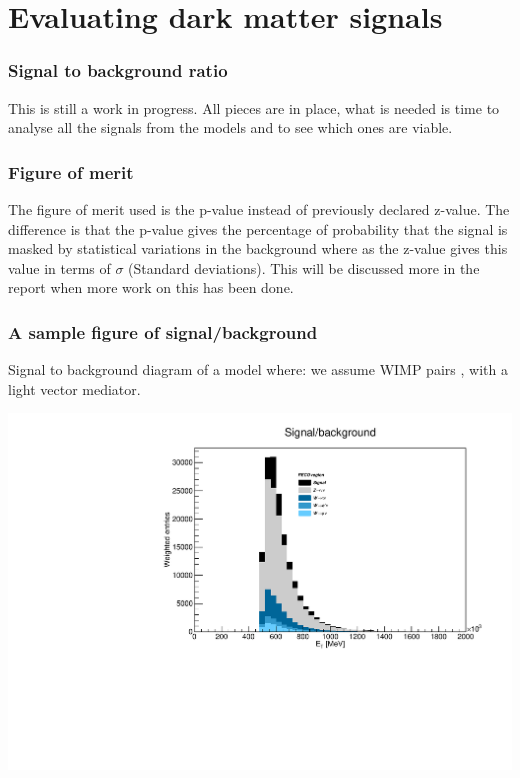 \documentclass[•]{beamer}
\theoremstyle{remark}
\begin{document}
\section{Evaluating dark matter signals}
\begin{frame}\frametitle{Signal to background ratio}
\begin{block}

This is still a work in progress. All pieces are in place, what is needed is time to analyse all the signals from the models and to see which ones are viable.
\end{block}
\end{frame}
\begin{frame}\frametitle{Figure of merit}
\begin{block}

The figure of merit used is the p-value instead of previously declared z-value. The difference is that the p-value gives the percentage of probability that the signal is masked by statistical variations in the background where as the z-value gives this value in terms of $\sigma$ (Standard deviations).
This will be discussed more in the report when more work on this has been done.
\end{block}
\end{frame}
\begin{frame}[shrink=45]\frametitle{A sample figure of signal/background}
\begin{block}

Signal to background diagram of a model where: we assume WIMP pairs , with a light vector mediator. 
\end{block}
\includegraphics[scale=0.8]{signalbackgroundex.pdf}
\end{frame}
\end{document}
